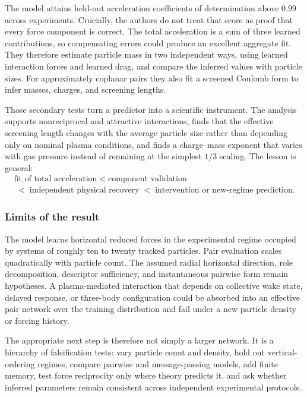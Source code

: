 The model attains held-out acceleration coefficients of determination above \(0.99\) across experiments. Crucially, the authors do not treat that score as proof that every force component is correct. The total acceleration is a sum of three learned contributions, so compensating errors could produce an excellent aggregate fit. They therefore estimate particle mass in two independent ways, using learned interaction forces and learned drag, and compare the inferred values with particle sizes. For approximately coplanar pairs they also fit a screened Coulomb form to infer masses, charges, and screening lengths.

Those secondary tests turn a predictor into a scientific instrument. The analysis supports nonreciprocal and attractive interactions, finds that the effective screening length changes with the average particle size rather than depending only on nominal plasma conditions, and finds a charge--mass exponent that varies with gas pressure instead of remaining at the simplest \(1/3\) scaling. The lesson is general:
\[
\begin{gathered}
\text{fit of total acceleration}
\;<\;
\text{component validation}
\\[-0.15em]
\;<\;
\text{independent physical recovery}
\;<\;
\text{intervention or new-regime prediction}.
\end{gathered}
\]

\subsubsection{Limits of the result}

The model learns horizontal reduced forces in the experimental regime occupied by systems of roughly ten to twenty tracked particles. Pair evaluation scales quadratically with particle count. The assumed radial horizontal direction, role decomposition, descriptor sufficiency, and instantaneous pairwise form remain hypotheses. A plasma-mediated interaction that depends on collective wake state, delayed response, or three-body configuration could be absorbed into an effective pair network over the training distribution and fail under a new particle density or forcing history.

The appropriate next step is therefore not simply a larger network. It is a hierarchy of falsification tests: vary particle count and density, hold out vertical-ordering regimes, compare pairwise and message-passing models, add finite memory, test force reciprocity only where theory predicts it, and ask whether inferred parameters remain consistent across independent experimental protocols.

